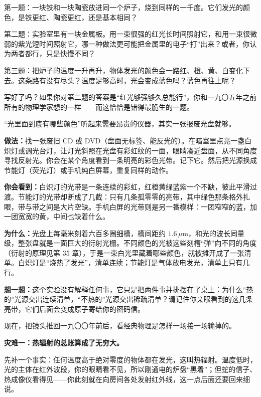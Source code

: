 第一题：一块铁和一块陶瓷放进同一个炉子，烧到同样的一千度。它们发光的颜色，是铁更红、陶瓷更红，还是基本相同？

第二题：实验室里有一块金属板。用一束很强的红光长时间照射它，和用一束很微弱的紫光短时间照射它，哪一种做法更可能把金属里的电子“打”出来？或者，你认为两者都行，只是快慢不同？

第三题：把炉子的温度一升再升，物体发光的颜色会一路红、橙、黄、白变化下去。这条路有没有尽头？温度足够高时，光会变成蓝色吗？蓝色再往上呢？

写好了吗？如果你对第二题的答案是“红光够强够久总能行”，你和一九〇五年之前所有的物理学家想的一样——而这恰恰是错得最脆生的一题。


\begin{experiment}
“光里面到底有哪些颜色”听起来需要昂贵的仪器，其实一张报废光盘就够。

\textbf{做法：}找一张废旧 CD 或 DVD（盘面无标签、能反光的）。在暗室里点亮一盏白炽灯或调光台灯，让灯光斜照在光盘有彩虹纹的一面，眼睛凑近盘面，从不同角度寻找反射光。你会在某个角度看到一条明亮的彩色光带。记下它。然后把光源换成节能灯（荧光灯）或手机纯白屏幕，重复同样的动作。

\textbf{你会看到：}白炽灯的光带是一条连续的彩虹，红橙黄绿蓝紫一个不缺，彼此平滑过渡。节能灯的光带却断成了几截：只有几条孤零零的亮带，其中绿色那条格外扎眼，带与带之间是大片空缺。手机白屏的光带则是另一番模样：一团窄窄的蓝，加一团宽宽的黄，中间也缺着什么。

\textbf{为什么：}光盘上每毫米刻着六百多圈细槽，槽间距约 \(1.6\,\mu\mathrm{m}\)，和光的波长同量级，整张盘就是一面巨大的衍射光栅。不同颜色的光被这些刻槽“弹”向不同的角度（衍射的原理见第 35 章），于是一束白光里藏着哪些颜色，就被摊开成了一张清单。白炽灯是“烧热了发光”，清单连续；节能灯是气体放电发光，清单上只有几行。

\textbf{想一想：}这个实验没有解释任何事，它只是把两件事并排摆在了桌上：为什么“热的”光源交出连续清单，“不热的”光源交出稀疏清单？请记住你亲眼看到的这几条亮带，它们后面会变成原子寄给你的密码信。
\end{experiment}


现在，把镜头推回一九〇〇年前后，看经典物理是怎样一场接一场输掉的。

\textbf{灾难一：热辐射的总账算成了无穷大。}

先补一个事实：任何温度高于绝对零度的物体都在发光，这叫热辐射。温度低时，光的主体在红外波段，你的眼睛看不见，所以刚通电的炉盘“黑着”；但蛇的信子、热成像仪看得见——你此刻就在向房间各处发射红外线，这一点后面还要回来细说。

